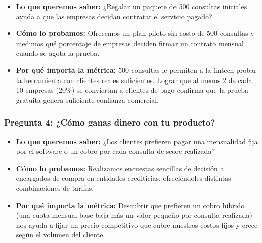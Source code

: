 \documentclass[11pt,a4paper]{article}
\begin{document}
\begin{tcolorbox}[colback=lightgray,colframe=secondary,title=\textbf{Experimento 3.2: Prueba de versión gratuita inicial (Freemium Pilot)}]
\begin{itemize}[leftmargin=*]
    \item \textbf{Lo que queremos saber:} ¿Regalar un paquete de 500 consultas iniciales ayuda a que las empresas decidan contratar el servicio pagado?
    \item \textbf{Cómo lo probamos:} Ofrecemos un plan piloto sin costo de 500 consultas y medimos qué porcentaje de empresas deciden firmar un contrato mensual cuando se agota la prueba.
    \item \textbf{Por qué importa la métrica:} 500 consultas le permiten a la fintech probar la herramienta con clientes reales suficientes. Lograr que al menos 2 de cada 10 empresas (20\%) se conviertan a clientes de pago confirma que la prueba gratuita genera suficiente confianza comercial.
\end{itemize}
\end{tcolorbox}

\subsubsection{Pregunta 4: ¿Cómo ganas dinero con tu producto?}

\begin{tcolorbox}[colback=lightgray,colframe=secondary,title=\textbf{Experimento 4.1: Encuesta de preferencia de modelo de cobro}]
\begin{itemize}[leftmargin=*]
    \item \textbf{Lo que queremos saber:} ¿Los clientes prefieren pagar una mensualidad fija por el software o un cobro por cada consulta de score realizada?
    \item \textbf{Cómo lo probamos:} Realizamos encuestas sencillas de decisión a encargados de compra en entidades crediticias, ofreciéndoles distintas combinaciones de tarifas.
    \item \textbf{Por qué importa la métrica:} Descubrir que prefieren un cobro híbrido (una cuota mensual base baja más un valor pequeño por consulta realizada) nos ayuda a fijar un precio competitivo que cubre nuestros costos fijos y crece según el volumen del cliente.
\end{itemize}
\end{tcolorbox}
\end{document}
